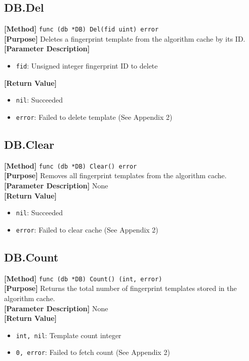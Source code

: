 \documentclass[11pt, a4paper]{article}
\begin{document}
\subsection{DB.Del}
\textbf{[Method]} \texttt{func (db *DB) Del(fid uint) error} \\
\textbf{[Purpose]} Deletes a fingerprint template from the algorithm cache by its ID. \\
\textbf{[Parameter Description]} 
\begin{itemize}
    \item \texttt{fid}: Unsigned integer fingerprint ID to delete
\end{itemize}
\textbf{[Return Value]} 
\begin{itemize}
    \item \texttt{nil}: Succeeded
    \item \texttt{error}: Failed to delete template (See Appendix 2)
\end{itemize}

\subsection{DB.Clear}
\textbf{[Method]} \texttt{func (db *DB) Clear() error} \\
\textbf{[Purpose]} Removes all fingerprint templates from the algorithm cache. \\
\textbf{[Parameter Description]} None \\
\textbf{[Return Value]} 
\begin{itemize}
    \item \texttt{nil}: Succeeded
    \item \texttt{error}: Failed to clear cache (See Appendix 2)
\end{itemize}

\subsection{DB.Count}
\textbf{[Method]} \texttt{func (db *DB) Count() (int, error)} \\
\textbf{[Purpose]} Returns the total number of fingerprint templates stored in the algorithm cache. \\
\textbf{[Parameter Description]} None \\
\textbf{[Return Value]} 
\begin{itemize}
    \item \texttt{int, nil}: Template count integer
    \item \texttt{0, error}: Failed to fetch count (See Appendix 2)
\end{itemize}
\end{document}
